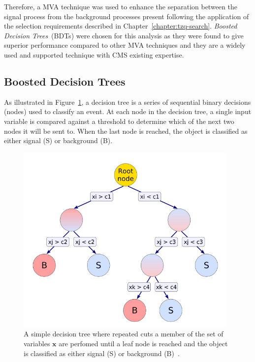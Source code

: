 Therefore, a MVA technique was used to enhance the separation between the signal process from the background processes present following the application of the selection requirements described in Chapter~\ref{chapter:tzq-search}.
\emph{Boosted Decision Trees}~(BDTs) were chosen for this analysis as they were found to give superior performance compared to other MVA techniques and they are a widely used and supported technique with CMS existing expertise.

\subsection{Boosted Decision Trees}\label{subsec:bdt}
As illustrated in Figure~\ref{fig:decisionTree}, a decision tree is a series of sequential binary decisions (nodes) used to classify an event.
At each node in the decision tree, a single input variable is compared against a threshold to determine which of the next two nodes it will be sent to.
When the last node is reached, the object is classified as either signal (S) or background (B).

\begin{figure}[htb]
\centering
\includegraphics[width=0.97\textwidth]{figs/background-estimation/decisionTree.pdf}
\caption{A simple decision tree where repeated cuts a member of the set of variables $\textbf{x}$ are perfomed until a leaf node is reached and the object is classified as either signal (S) or background (B)~\cite{Hocker:2007ht}.
}
\label{fig:decisionTree}
\end{figure}


